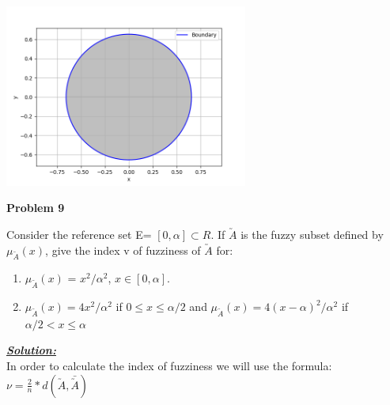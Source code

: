 \documentclass{article}
\begin{document}
\begin{center}
\includegraphics[width=0.6\textwidth]{Problem8.png}
\end{center}





\newpage
\noindent \textbf{Problem 9}

\noindent Consider the reference set E= $[0, \alpha] \subset R$. If $\utilde{A}$ is the fuzzy subset defined by 
$\mu_{\utilde{A}}(x)$, give the index v of fuzziness of $\utilde{A}$ for:

\begin{enumerate} [label=\Alph*]
  \item $\mu_{\utilde{A}}(x)$ = $x^2/\alpha^2$, $x \in [0, \alpha].$
  \item $\mu_{\utilde{A}}(x) = 4x^2/\alpha^2$ if $0 \leq x\leq \alpha/2$ and $\mu_{\utilde{A}}(x) = 4(x-\alpha)^2/\alpha^2$ if $\alpha/2  <x \leq \alpha$
\end{enumerate}

\noindent \underline{\textbf{\textit{Solution:}}} \\

\noindent In order to calculate the index of fuzziness we will use the formula: $\nu = \frac{2}{n} * d(\utilde A,  \bar{ \utilde{ A}})$
\end{document}

